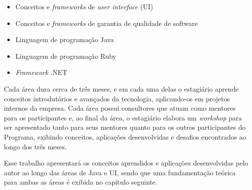 \begin{itemize}
	\item Conceitos e \textit{frameworks} de \textit{user interface} (UI)
	\item Conceitos e \textit{frameworks} de garantia de qualidade de software
	\item Linguagem de programação Java
	\item Linguagem de programação Ruby
	\item \textit{Framework} .NET
\end{itemize}

Cada área dura cerca de três meses, e em cada uma delas o estagiário aprende conceitos introdutórios e avançados da tecnologia, aplicando-os em projetos internos da empresa. Cada área possui consultores que atuam como mentores para os participantes e, ao final da área, o estagiário elabora um \textit{workshop} para ser apresentado tanto para seus mentores quanto para os outros participantes do Programa, exibindo conceitos, aplicações desenvolvidas e desafios encontrados ao longo dos três meses.

Esse trabalho apresentará os conceitos aprendidos e aplicações desenvolvidas pelo autor ao longo das áreas de Java e UI, sendo que uma fundamentação teórica para ambas as áreas é exibida no capítulo seguinte.
